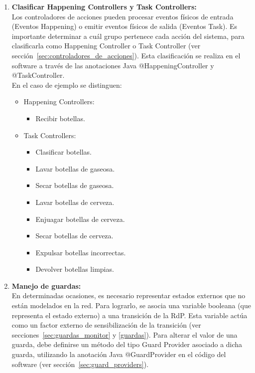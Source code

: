 \begin{enumerate}
\item \textbf{Clasificar Happening Controllers y Task Controllers:}\\
            Los controladores de acciones pueden procesar eventos físicos de entrada
            (Eventos Happening) o emitir eventos físicos de salida (Eventos Task). Es
            importante determinar a cuál grupo pertenece cada acción del
            sistema, para clasificarla como Happening Controller o Task Controller (ver
            sección~\ref{sec:controladores_de_acciones}).
            Esta clasificación se realiza en el software a través de las anotaciones Java
            @HappeningController y @TaskController. \\
            En el caso de ejemplo se distinguen:
            \begin{itemize}
              \item Happening Controllers:
                  \begin{itemize}
                    \item Recibir botellas.
                  \end{itemize}
              \item Task Controllers:
                  \begin{itemize}
                  \item Clasificar botellas.
                  \item Lavar botellas de gaseosa.
                  \item Secar botellas de gaseosa.
                  \item Lavar botellas de cerveza.
                  \item Enjuagar botellas de cerveza.
                  \item Secar botellas de cerveza.
                  \item Expulsar botellas incorrectas.
                  \item Devolver botellas limpias.
                  \end{itemize}
            \end{itemize}

\item \textbf{Manejo de guardas:}\\
            En determinadas ocasiones, es necesario representar
            estados externos que no están modelados en la red. Para lograrlo, se
            asocia una variable booleana (que representa el estado externo) a
            una transición de la RdP.
            Esta variable actúa como un factor externo de sensibilización de la transición (ver
            secciones~\ref{sec:guardas_monitor} y \ref{guardas}).
            Para alterar el valor de una guarda, debe definirse un método del tipo Guard Provider
            asociado a dicha guarda, utilizando la anotación Java @GuardProvider en el
            código del software (ver sección~\ref{sec:guard_providers}).
    

\end{enumerate}
